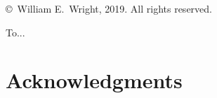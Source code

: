 % 
% 
% 
% 
%






\captionsetup[subfigure]{labelfont=rm}



   \frontmatter

   \pagestyle{prelim}
   
   
   \newpage
	
	 \thispagestyle{empty}
	 \begin{titlepage}
	 \vspace*{50em}
	 \begin{center}
		 \copyright \ William E.\ Wright, 2019.  All rights reserved.  
	 \end{center}
	 \end{titlepage}
	 \newpage
	
	
	 \thispagestyle{empty}
	 \vspace*{20em}
	 \begin{center}
	   To...
	 \end{center}
	 \newpage
   
   
   \doublespacing
   
   \tableofcontents
   \newpage
   
   
   \newpage
   
   \section*{Acknowledgments}
   
   
   \mainmatter
   
   \pagestyle{maintext}
   
   
